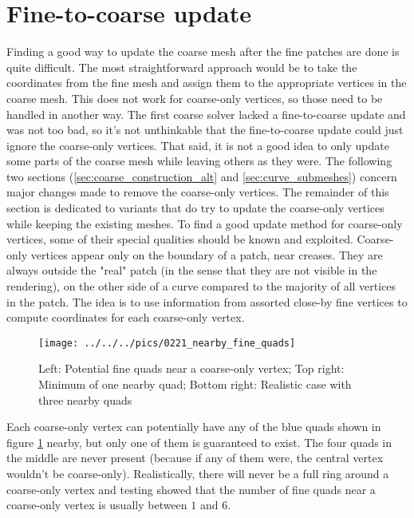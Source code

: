 \documentclass[a4paper,twoside,12pt,nochapterprefix]{scrbook}
\begin{document}
\section{Fine-to-coarse update}\label{ftc_update}
Finding a good way to update the coarse mesh after the fine patches are done is quite difficult. The most straightforward approach would be to take the coordinates from the fine mesh and assign them to the appropriate vertices in the coarse mesh. This does not work for coarse-only vertices, so those need to be handled in another way.\newline
The first coarse solver lacked a fine-to-coarse update and was not too bad, so it's not unthinkable that the fine-to-coarse update could just ignore the coarse-only vertices. That said, it is not a good idea to only update some parts of the coarse mesh while leaving others as they were.\newline
The following two sections (\ref{sec:coarse_construction_alt} and \ref{sec:curve_submeshes}) concern major changes made to remove the coarse-only vertices. The remainder of this section is dedicated to variants that do try to update the coarse-only vertices while keeping the existing meshes.\newline
To find a good update method for coarse-only vertices, some of their special qualities should be known and exploited. Coarse-only vertices appear only on the boundary of a patch, near creases. They are always outside the "real" patch (in the sense that they are not visible in the rendering), on the other side of a curve compared to the majority of all vertices in the patch. The idea is to use information from assorted close-by fine vertices to compute coordinates for each coarse-only vertex.\newline
\begin{figure}
    \centering
    \texttt{[image: ../../../pics/0221\_nearby\_fine\_quads]}
    \caption{Left: Potential fine quads near a coarse-only vertex; Top right: Minimum of one nearby quad; Bottom right: Realistic case with three nearby quads
      \label{fig:coarseonly_neighbourhood}}
\end{figure}
Each coarse-only vertex can potentially have any of the blue quads shown in figure \ref{fig:coarseonly_neighbourhood} nearby, but only one of them is guaranteed to exist. The four quads in the middle are never present (because if any of them were, the central vertex wouldn't be coarse-only). Realistically, there will never be a full ring around a coarse-only vertex and testing showed that the number of fine quads near a coarse-only vertex is usually between $1$ and $6$.\newline
\end{document}
